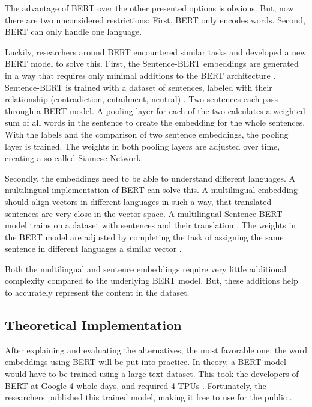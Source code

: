 			The advantage of BERT over the other presented options is obvious. But, now there are two unconsidered restrictions:
			First, BERT only encodes words.
			Second, BERT can only handle one language.
			
			Luckily, researchers around BERT encountered similar tasks and developed a new BERT model to solve this. 
			First, the Sentence-BERT embeddings are generated in a way that requires only minimal additions to the BERT architecture \cite[p.~2]{sentenceBERT}. Sentence-BERT is trained with a dataset of sentences, labeled with their relationship (contradiction, entailment, neutral) \cite[p.~4]{sentenceBERT}. Two sentences each pass through a BERT model. A pooling layer for each of the two calculates a weighted sum of all words in the sentence to create the embedding for the whole sentences. With the labels and the comparison of two sentence embeddings, the pooling layer is trained. The weights in both pooling layers are adjusted over time, creating a so-called Siamese Network.
			
			Secondly, the embeddings need to be able to understand different languages. A multilingual implementation of BERT can solve this. A multilingual embedding should align vectors in different languages in such a way, that translated sentences are very close in the vector space. A multilingual Sentence-BERT model trains on a dataset with sentences and their translation \cite[p.~2]{mBERT}. The weights in the BERT model are adjusted by completing the task of assigning the same sentence in different languages a similar vector \cite[p.~2]{mBERT}.
			
			Both the multilingual and sentence embeddings require very little additional complexity compared to the underlying BERT model. But, these additions help to accurately represent the content in the dataset.
			
            \subsection{Theoretical Implementation}
            
           	After explaining and evaluating the alternatives, the most favorable one, the word embeddings using \ac{BERT} will be put into practice. In theory, a BERT model would have to be trained using a large text dataset. This took the developers of BERT at Google 4 whole days, and required 4 \ac{TPU}s \cite{BERTTraining}. Fortunately, the researchers published this trained model, making it free to use for the public \cite[p.~2]{BERT}.
            	
